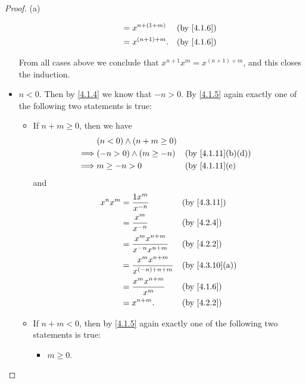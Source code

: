 \begin{proof}{(a)}
\begin{itemize}
\begin{itemize}
\begin{align*}
                                & = x^{n + (1 + m)}  &  & \by{4.1.6}                  \\
                                & = x^{(n + 1) + m}. &  & \by{4.1.6}
                  \end{align*}
          \end{itemize}
          From all cases above we conclude that \(x^{n + 1} x^m = x^{(n + 1) + m}\), and this closes the induction.
    \item \(n < 0\).
          Then by \cref{4.1.4} we know that \(-n > 0\).
          By \cref{4.1.5} again exactly one of the following two statements is true:
          \begin{itemize}
            \item If \(n + m \geq 0\), then we have
                  \begin{align*}
                             & (n < 0) \land (n + m \geq 0)                                      \\
                    \implies & (-n > 0) \land (m \geq -n)   &  & \text{(by \cref{4.1.11}(b)(d))} \\
                    \implies & m \geq -n > 0                &  & \text{(by \cref{4.1.11}(e)}
                  \end{align*}
                  and
                  \begin{align*}
                    x^n x^m & = \dfrac{1x^m}{x^{-n}}                    &  & \text{(by \cref{4.3.11})}    \\
                            & = \dfrac{x^m}{x^{-n}}                     &  & \by{4.2.4}                   \\
                            & = \dfrac{x^m x^{n + m}}{x^{-n} x^{n + m}} &  & \by{4.2.2}                   \\
                            & = \dfrac{x^m x^{n + m}}{x^{(-n) + n + m}} &  & \text{(by \cref{4.3.10}(a))} \\
                            & = \dfrac{x^m x^{n + m}}{x^m}              &  & \by{4.1.6}                   \\
                            & = x^{n + m}.                              &  & \by{4.2.2}
                  \end{align*}
            \item If \(n + m < 0\), then by \cref{4.1.5} again exactly one of the following two statements is true:
                  \begin{itemize}
                    \item \(m \geq 0\).

\end{itemize}
\end{itemize}
\end{itemize}
\end{proof}
